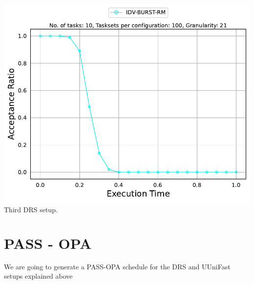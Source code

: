 \documentclass[]{article}
\begin{document}
\begin{minipage}[t]{0.48\linewidth}
		\includegraphics[width=\linewidth]{IDV-BURST-RM_3rdSetup_DRS.pdf}
		Third DRS setup.
		\vspace{0.3cm}
	\end{minipage}


	\clearpage
	\section{PASS - OPA}
{
\raggedleft We are going to generate a PASS-OPA schedule for the DRS and UUniFast setups explained above \newline 
}
\end{document}
